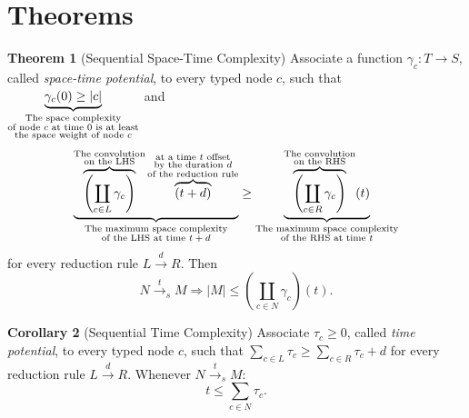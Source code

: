 \documentclass{fit-teorsem}
\begin{document}
\section*{Theorems}
\textbf{Theorem 1} (Sequential Space-Time Complexity) Associate a function $\gamma_c : T \to S$,
called \textit{space-time potential}, to every typed node $c$, such that
$\underbrace{\gamma_c(0) \ge |c|}_{\begin{subarray}{c}
	\text{The space complexity} \\
	\text{of node $c$ at time $0$ is at least} \\
	\text{the space weight of node $c$}
\end{subarray}}$ and \[
	\underbrace{\overbrace{\left(\coprod_{c \in L} \gamma_c\right)}^{\begin{subarray}{c}
			\text{The convolution} \\
			\text{on the LHS}
		\end{subarray}}\overbrace{(t + d)}^{\begin{subarray}{c}
			\text{at a time $t$ offset} \\
			\text{by the duration $d$} \\
			\text{of the reduction rule}
		\end{subarray}}}_{
	\begin{subarray}{c}
		\text{The maximum space complexity} \\
		\text{of the LHS at time $t + d$}
	\end{subarray}}
		\ge \underbrace{\overbrace{\left(\coprod_{c \in R} \gamma_c\right)}^{\begin{subarray}{c}
				\text{The convolution} \\
				\text{on the RHS}
			\end{subarray}}(t)}_{
		\begin{subarray}{c}
			\text{The maximum space complexity} \\
			\text{of the RHS at time $t$}
		\end{subarray}}
\] for every reduction rule $L \stackrel{d}{\longrightarrow} R$. Then \[
	N \stackrel{t}{\longrightarrow}_s M
		\Longrightarrow |M| \le \left(\coprod_{c \in N} \gamma_c\right)(t)
.\]

\textbf{Corollary 2} (Sequential Time Complexity) Associate $\tau_c \ge 0$, called \textit{time potential},
to every typed node $c$, such that $\sum_{c \in L} \tau_c \ge \sum_{c \in R} \tau_c + d$ for
every reduction rule $L \stackrel{d}{\longrightarrow} R$. Whenever
$N \stackrel{t}{\longrightarrow}_s M$: \[
	t \le \sum_{c \in N} \tau_c
.\]
\end{document}
